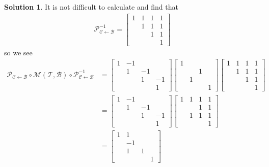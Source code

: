 \documentclass{amsart}
\theoremstyle{definition}
\theoremstyle{definition}
\newtheorem*{solution}{Solution}
\DeclareMathOperator{\1}{\mathbbm{1}}
\begin{document}
\begin{enumerate}[itemsep = 2mm]
\begin{enumerate}[label=\arabic*.]
			\begin{solution}
				It is not difficult to calculate and find that
				\begin{align*}
				\mathcal{P}_{\mathcal{C}\leftarrow\mathcal{B}}^{-1} = \begin{bmatrix}
				1 & 1 & 1 & 1 \\ & 1 & 1 & 1 \\ & & 1 & 1 \\ & & & 1
				\end{bmatrix}
				\end{align*}
				so we see
				\begin{align*}
					\mathcal{P}_{\mathcal{C}\leftarrow\mathcal{B}}\circ\mathcal{M}(\mathcal{T},\mathcal{B})\circ \mathcal{P}_{\mathcal{C}\leftarrow\mathcal{B}}^{-1} &= \begin{bmatrix}
					1 & -1 & & \\ & 1 & -1 & \\ & & 1 & -1 \\ & & & 1
					\end{bmatrix}  \begin{bmatrix}
					1 & & & \\ & & 1 & \\ & 1 & & \\ & & & 1
					\end{bmatrix} \begin{bmatrix}
					1 & 1 & 1 & 1 \\ & 1 & 1 & 1 \\ & & 1 & 1 \\ & & & 1
					\end{bmatrix} \\
					&= \begin{bmatrix}
					1 & -1 & & \\ & 1 & -1 & \\ & & 1 & -1 \\ & & & 1
					\end{bmatrix}  \begin{bmatrix}
					1 & 1 & 1 & 1 \\ & & 1 & 1 \\ & 1 & 1 & 1 \\ & & & 1
					\end{bmatrix} \\
					&= \begin{bmatrix}
					1 & 1 & & \\ & -1 & & \\ & 1 & 1 & \\ & & & 1
					\end{bmatrix}
				\end{align*}
			\end{solution}
			

\end{enumerate}
\end{enumerate}
\end{document}
